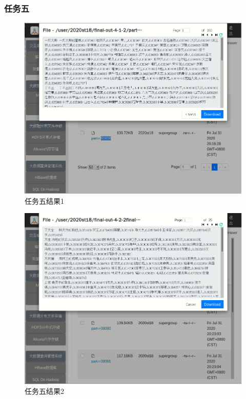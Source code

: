 \documentclass[a4paper,UTF8]{article}
\numberwithin{equation}{section}
\begin{document}
\subsubsection{任务五}
\begin{figure}[H]
    \centering
    \includegraphics[width = 15cm]{task5-1-output.png}
    \caption{任务五结果1}
\end{figure}
\begin{figure}[H]
    \centering
    \includegraphics[width = 15cm]{task5-2-output.png}
    \caption{任务五结果2}
\end{figure}
\end{document}
